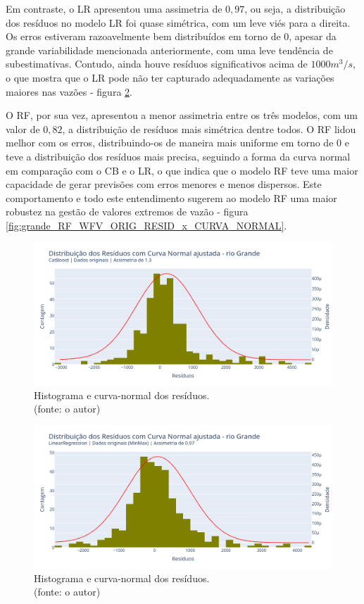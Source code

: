 Em contraste, o LR apresentou uma assimetria de $0,97$, ou seja, a distribuição dos resíduos no modelo LR foi quase simétrica, com um leve viés para a direita. Os erros estiveram razoavelmente bem distribuídos em torno de $0$, apesar da grande variabilidade mencionada anteriormente, com uma leve tendência de subestimativas. Contudo, ainda houve resíduos significativos acima de $1000 m^3/s$, o que mostra que o LR pode não ter capturado adequadamente as variações maiores nas vazões - figura \ref{fig:grande_LR_WFV_ORIG_RESID_x_CURVA_NORMAL}.

O RF, por sua vez, apresentou a menor assimetria entre os três modelos, com um valor de $0,82$, a distribuição de resíduos mais simétrica dentre todos. O RF lidou melhor com os erros, distribuindo-os de maneira mais uniforme em torno de $0$ e teve a distribuição dos resíduos mais precisa, seguindo a forma da curva normal em comparação com o CB e o LR, o que indica que o modelo RF teve uma maior capacidade de gerar previsões com erros menores e menos dispersos. Este comportamento e todo este entendimento sugerem ao modelo RF uma maior robustez na gestão de valores extremos de vazão - figura \ref{fig:grande_RF_WFV_ORIG_RESID_x_CURVA_NORMAL}.

\begin{figure}[!h]
\centering
\includegraphics[scale=0.33]{Figuras/rio_grande/wfv/CB/CB_WFV_ORIG_RESID_x_CURVA_NORMAL.png}
\caption{Histograma e curva-normal dos resíduos.\\(fonte: o autor)}
\label{fig:grande_CB_WFV_ORIG_RESID_x_CURVA_NORMAL}
\end{figure}

\begin{figure}[!h]
\centering
\includegraphics[scale=0.33]{Figuras/rio_grande/wfv/LR/LR_WFV_ORIG_RESID_x_CURVA_NORMAL.png}
\caption{Histograma e curva-normal dos resíduos.\\(fonte: o autor)}
\label{fig:grande_LR_WFV_ORIG_RESID_x_CURVA_NORMAL}
\end{figure}


